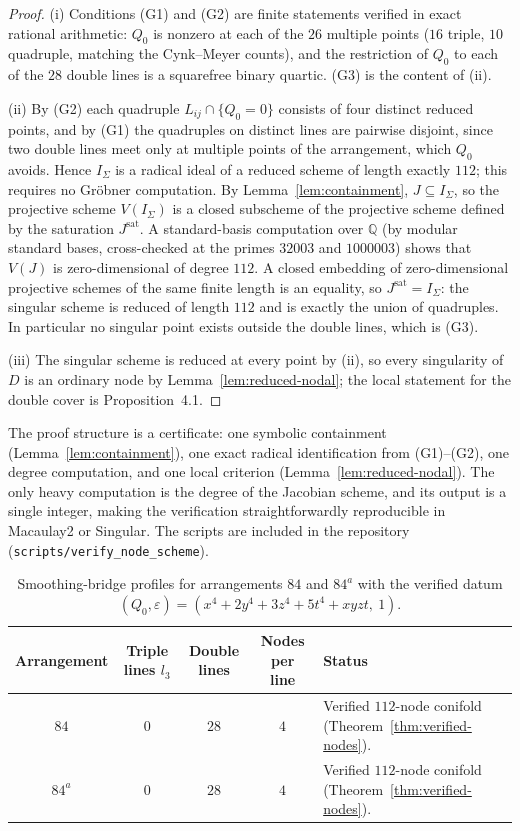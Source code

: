 \begin{proof}
(i) Conditions (G1) and (G2) are finite statements verified in exact
rational arithmetic: $Q_0$ is nonzero at each of the $26$ multiple points
($16$ triple, $10$ quadruple, matching the Cynk--Meyer counts), and the
restriction of $Q_0$ to each of the $28$ double lines is a squarefree
binary quartic. (G3) is the content of (ii).

(ii) By (G2) each quadruple $L_{ij} \cap \{Q_0 = 0\}$ consists of four
distinct reduced points, and by (G1) the quadruples on distinct lines are
pairwise disjoint, since two double lines meet only at multiple points of
the arrangement, which $Q_0$ avoids. Hence $I_\Sigma$ is a radical ideal
of a reduced scheme of length exactly $112$; this requires no Gr\"obner
computation. By Lemma~\ref{lem:containment}, $J \subseteq I_\Sigma$, so the
projective scheme $V(I_\Sigma)$ is a closed subscheme of the projective
scheme defined by the saturation $J^{\mathrm{sat}}$. A standard-basis
computation over $\mathbb{Q}$ (by modular standard bases, cross-checked at
the primes $32003$ and $1000003$) shows that $V(J)$ is zero-dimensional of
degree $112$. A closed embedding of zero-dimensional projective schemes of
the same finite length is an equality, so
$J^{\mathrm{sat}} = I_\Sigma$: the singular scheme is reduced of length
$112$ and is exactly the union of quadruples. In particular no singular
point exists outside the double lines, which is (G3).

(iii) The singular scheme is reduced at every point by (ii), so every
singularity of $D$ is an ordinary node by Lemma~\ref{lem:reduced-nodal};
the local statement for the double cover is Proposition~4.1.
\end{proof}

\begin{remark}
The proof structure is a certificate: one symbolic containment
(Lemma~\ref{lem:containment}), one exact radical identification from
(G1)--(G2), one degree computation, and one local criterion
(Lemma~\ref{lem:reduced-nodal}). The only heavy computation is the degree
of the Jacobian scheme, and its output is a single integer, making the
verification straightforwardly reproducible in Macaulay2 or Singular. The
scripts are included in the repository
(\texttt{scripts/verify\_node\_scheme}).
\end{remark}

\begin{table}[htbp]
\caption{Smoothing-bridge profiles for arrangements $84$ and $84^{a}$ with
the verified datum $(Q_0, \varepsilon) = (x^4+2y^4+3z^4+5t^4+xyzt,\ 1)$.}
\begin{tabular}{ccccl}
\hline
Arrangement & Triple lines $l_3$ & Double lines & Nodes per line & Status \\
\hline
$84$   & $0$ & $28$ & $4$ & Verified $112$-node conifold
                             (Theorem~\ref{thm:verified-nodes}). \\
$84^a$ & $0$ & $28$ & $4$ & Verified $112$-node conifold
                             (Theorem~\ref{thm:verified-nodes}). \\
\hline
\end{tabular}
\end{table}

